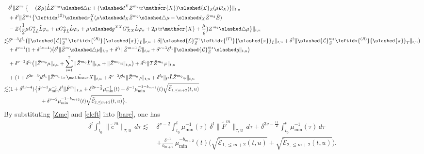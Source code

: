 \documentclass[11pt,twoside]{article}
\def\al{\alpha}
\def\de{\delta}
\def\dl{\delta}
\def\vp{\varphi}
\def\f{\frac}
\begin{document}
\begin{align}
&\delta^l\|{\bar Z}^{m_1}\big\{-(\bar Z\mu)\mathring L\bar Z^{m_2}\slashed\triangle\mu+(\slashed d^X{\bar Z}^{m_2}\mathrm{tr}\check{\mathscr{X}})\slashed{\mathcal L}_{\bar Z}(\mu\mathcal Q_X)\big\}\|_{t,u}\nonumber\\
&+\delta^l\|{\bar Z}^{m_1}\big\{\leftidx^{{(\bar Z)}}{\slashed\pi}_{\mathring L}^X(\mu\slashed d_X\bar Z^{m_2}\slashed\triangle\mu-\slashed d_X\bar Z^{m_2}\tilde E)\nonumber\\
&-\bar Z\bigl(\f12\mu G_{\mathring L\mathring L}^\al\mathring L\vp_\al+\mu G_{\tilde T\mathring L}^\al\mathring L\vp_\al+\mu\slashed g^{XX}G_{XX}^\al\mathring L\vp_\al+2\mu\,\mathrm{tr}\check{\mathscr{X}}+\f\mu\varrho\bigr)\bar Z^{m_2}\slashed \triangle\mu\big\}\|_{t,u}\nonumber\\
\lesssim &\delta^{\nu-3}\delta^{l_1}\bigl(\|\slashed{\mathcal{L}}_{\bar{Z}}^{m_1}\leftidx{^{(R)}}{\slashed{\pi}}_{\mathring L}\|_{t,u}
+\delta\|\slashed{\mathcal{L}}_{\bar{Z}}^{m_1}\leftidx{^{(T)}}{\slashed{\pi}}_{\mathring{L}}\|_{t,u}
+\delta^2\|\slashed{\mathcal{L}}_{\bar{Z}}^{m_1}\leftidx{^{(R)}}{\slashed{\pi}}_T\|_{t,u}\bigr)\nonumber\\
&+\delta^{\nu-1}(1+\delta^{3\nu-4})\bigl(\delta^{l}\|\bar Z^m\slashed\triangle\mu\|_{t,u}+\delta^{l_1}\|\bar Z^{m-1}\tilde E\|_{t,u}+\delta^{\nu-3}\delta^{l_1}\|\slashed{\mathcal{L}}_{\bar{Z}}^{m_1}\slashed g\|_{t,u}\bigr)\nonumber\\
&+\delta^{\nu-2}\delta^{l_0}\bigl(\|\bar Z^{m_0}\mu\|_{t,u}+\sum_{i=1}^2\|\bar Z^{m_0}\check L^i\|_{t,u}+\|\bar Z^{m_0}\upsilon\|_{t,u}\bigr)+\delta^{l_0}\|T\bar Z^{m_0}\vp\|_{t,u}\nonumber\\
&+(1+\delta^{2\nu-3})\delta^{l_1}\|\bar Z^{m_1}\operatorname{tr}\check{\mathscr X}\|_{t,u}+\delta^{\nu-2}\delta^{l_0}\|\bar Z^{m_0}\vp\|_{t,u}+\delta^{l_0}\|\mu\mathring L\bar Z^{m_0}\vp\|_{t,u}\nonumber\\
\lesssim &(1+\delta^{3\nu-4})\big\{\delta^{\nu-1}\mu_{\min}^{-1}\de^l\|\tilde F^m\|_{t,u}+\de^{2\nu-\f72}\mu_{\min}^{-1}(t)+\delta^{-1}\mu_{\min}^{-1-b_{m+2}}(t)\sqrt{\widetilde{\mathcal{E}}_{1,\leq m+2}(t,u)}\label{eleft}\\
&\qquad\qquad\qquad+\delta^{\nu-2}\mu_{\min}^{-1-b_{m+2}}(t)\sqrt{\widetilde{\mathcal{E}}_{2,\leq m+2}(t,u)}\big\}.\nonumber
\end{align}
By substituting \eqref{Zme} and \eqref{eleft} into \eqref{bare}, one has
\begin{equation}\label{intem}
\begin{split}
\delta^l \int_{t_0}^t \|\tilde{e}^m\|_{\tau,u} \, d\tau
\lesssim \,&\delta^{\nu-2} \int_{t_0}^t \mu_{\min}^{-1}(\tau) \, \dl^l \|\tilde{F}^m\|_{\tau,u} \, d\tau
+ \delta^{3\nu-\frac{11}{2}} \int_{t_0}^t \mu_{\min}^{-1}(\tau) \, d\tau \\
&+ \frac{\delta^{-1}}{b_{m+2}} \, \mu_{\min}^{-b_{m+2}}(t)
\big(\sqrt{\widetilde{\mathcal{E}}_{1,\leq m+2}(t,u)}
+ \sqrt{\widetilde{\mathcal{E}}_{2,\leq m+2}(t,u)}\big).
\end{split}
\end{equation}
\end{document}
